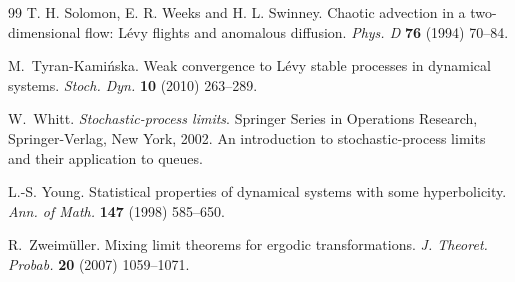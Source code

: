 \documentclass[12pt]{article}
\numberwithin{equation}{section}
\begin{document}
\begin{thebibliography}{99}
T. H. Solomon, E. R. Weeks and H. L. Swinney.
Chaotic advection in a two-dimensional flow: L\'evy flights and anomalous diffusion.
\emph{Phys. D} \textbf{76} (1994) 70--84.

M.~Tyran-Kami{\'n}ska. Weak convergence to {L}\'evy stable processes in
  dynamical systems. \emph{Stoch. Dyn.} \textbf{10} (2010) 263--289.

W.~Whitt. \emph{Stochastic-process limits}. Springer Series in Operations
  Research, Springer-Verlag, New York, 2002. An introduction to
  stochastic-process limits and their application to queues.


L.-S. Young. Statistical properties of dynamical systems with some
  hyperbolicity. \emph{Ann. of Math.} \textbf{147} (1998) 585--650.

R.~Zweim{\"u}ller. Mixing limit theorems for ergodic transformations. \emph{J.
  Theoret. Probab.} \textbf{20} (2007) 1059--1071.


\end{thebibliography}
\end{document}
